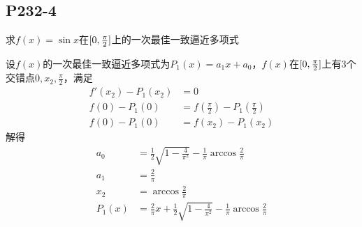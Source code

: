 \subsection{P232-4}
\renewcommand{\FX}{\sin x}
\renewcommand{\LRANGE}{0}
\renewcommand{\RRANGE}{\frac{\pi}{2}}
求$f(x) = \sin{x}$在$\RANGE$上的一次最佳一致逼近多项式
\begin{SOLVE}
设$f(x)$的一次最佳一致逼近多项式为$P_1(x) = a_1 x + a_0$，$f(x)$在$\RANGE$上有3个交错点$\LRANGE, x_2, \RRANGE$，满足
\begin{align*}
f'(x_2) - P_1(x_2)        & = 0\\
f(\LRANGE) - P_1(\LRANGE) & = f(\RRANGE) - P_1(\RRANGE)\\
f(\LRANGE) - P_1(\LRANGE) & = f(x_2) - P_1(x_2)
\end{align*}
解得
\begin{align*}
a_0    & = \frac{1}{2} \sqrt{1-\frac{4}{\pi^2}} - \frac{1}{\pi} \arccos{\frac{2}{\pi}}\\
a_1    & = \frac{2}{\pi}\\
x_2    & = \arccos{\frac{2}{\pi}}\\
P_1(x) & = \frac{2}{\pi} x + \frac{1}{2} \sqrt{1-\frac{4}{\pi^2}} - \frac{1}{\pi} \arccos{\frac{2}{\pi}}
\end{align*}
\end{SOLVE}